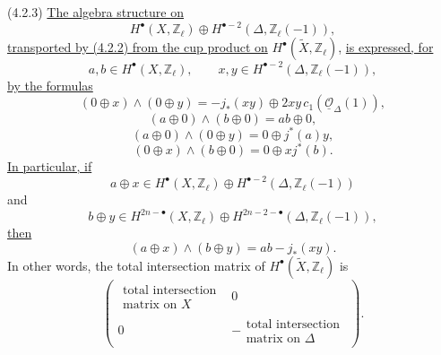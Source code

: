 \smallskip
\noindent
\textup{(4.2.3)} \underline{The algebra structure on}
\[
H^\bullet(X,\mathbb Z_\ell)\oplus
H^{\bullet-2}(\Delta,\mathbb Z_\ell(-1)),
\]
\underline{transported by (4.2.2) from the cup product on}
$H^\bullet(\widetilde X,\mathbb Z_\ell)$,
\underline{is expressed, for}
\[
a,b\in H^\bullet(X,\mathbb Z_\ell),
\qquad
x,y\in H^{\bullet-2}(\Delta,\mathbb Z_\ell(-1)),
\]
\underline{by the formulas}
\begin{equation}\tag{4.2.3.1}
(0\oplus x)\wedge(0\oplus y)
=-j_*(xy)\oplus2xy\,c_1(\underline{\mathcal O}_\Delta(1)),
\end{equation}
\begin{equation}\tag{4.2.3.2}
(a\oplus0)\wedge(b\oplus0)=ab\oplus0,
\end{equation}
\begin{equation}\tag{4.2.3.3}
(a\oplus0)\wedge(0\oplus y)=0\oplus j^*(a)y,
\end{equation}
\begin{equation}\tag{4.2.3.4}
(0\oplus x)\wedge(b\oplus0)=0\oplus xj^*(b).
\end{equation}
\underline{In particular, if}
\[
a\oplus x\in H^\bullet(X,\mathbb Z_\ell)
  \oplus H^{\bullet-2}(\Delta,\mathbb Z_\ell(-1))
\]
and
\[
b\oplus y\in H^{2n-\bullet}(X,\mathbb Z_\ell)
  \oplus H^{2n-2-\bullet}(\Delta,\mathbb Z_\ell(-1)),
\]
\underline{then}
\begin{equation}\tag{4.2.3.5}
(a\oplus x)\wedge(b\oplus y)=ab-j_*(xy).
\end{equation}
In other words, the total intersection matrix of
$H^\bullet(\widetilde X,\mathbb Z_\ell)$ is
\[
\left(
\begin{array}{c|c}
\begin{array}{c}
\text{total intersection}\\[-1pt]
\text{matrix on $X$}
\end{array} & 0\\ \hline
0 &
-\begin{array}{c}
\text{total intersection}\\[-1pt]
\text{matrix on $\Delta$}
\end{array}
\end{array}
\right).
\]

